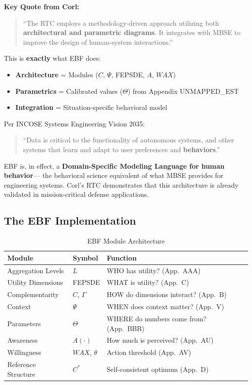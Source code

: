 \textbf{Key Quote from Corl:}
\begin{quote}
``The RTC employs a methodology-driven approach utilizing both \textbf{architectural
and parametric diagrams}. It integrates with MBSE to improve the design of
human-system interactions.''
\end{quote}

This is \textbf{exactly} what EBF does:
\begin{itemize}[nosep]
    \item \textbf{Architecture} = Modules ($C$, $\Psi$, FEPSDE, $A$, $WAX$)
    \item \textbf{Parametrics} = Calibrated values ($\Theta$) from Appendix UNMAPPED_EST
    \item \textbf{Integration} = Situation-specific behavioral model
\end{itemize}

Per INCOSE Systems Engineering Vision 2035:
\begin{quote}
``Data is critical to the functionality of autonomous systems, and other systems that
learn and adapt to user preferences and \textbf{behaviors}.''
\end{quote}

EBF is, in effect, a \textbf{Domain-Specific Modeling Language for human behavior}---
the behavioral science equivalent of what MBSE provides for engineering systems.
Corl's RTC demonstrates that this architecture is already validated in
mission-critical defense applications.

\subsection{The EBF Implementation}

\begin{table}[htbp]
\centering
\caption{EBF Module Architecture}
\label{tab:ebf-modules}
\renewcommand{\arraystretch}{1.3}
\begin{tabular}{@{}llp{6cm}@{}}
\toprule
\textbf{Module} & \textbf{Symbol} & \textbf{Function} \\
\midrule
Aggregation Levels & $L$ & WHO has utility? (App.\ AAA) \\
Utility Dimensions & FEPSDE & WHAT is utility? (App.\ C) \\
Complementarity & $C$, $\Gamma$ & HOW do dimensions interact? (App.\ B) \\
Context & $\Psi$ & WHEN does context matter? (App.\ V) \\
Parameters & $\Theta$ & WHERE do numbers come from? (App.\ BBB) \\
Awareness & $A(\cdot)$ & How much is perceived? (App.\ AU) \\
Willingness & $WAX$, $\theta$ & Action threshold (App.\ AV) \\
Reference Structure & $C^*$ & Self-consistent optimum (App.\ D) \\
\bottomrule
\end{tabular}
\end{table}

